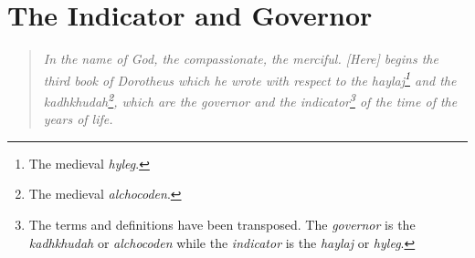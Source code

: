 \chapter{The Indicator and Governor}
\begin{quote}
\textsl{In the name of God, the compassionate, the merciful. [Here] begins the third book of Dorotheus which he wrote with respect to the haylaj\footnote{The medieval \textsl{hyleg}.} and the kadhkhudah\footnote{The medieval \textsl{alchocoden}.}, which are the governor and the indicator\footnote{The terms and definitions have been transposed. The \textsl{governor} is the \textsl{kadhkhudah} or \textsl{alchocoden} while the \textsl{indicator} is the \textsl{haylaj} or \textsl{hyleg}. } of the time of the years of life.}
\end{quote}

